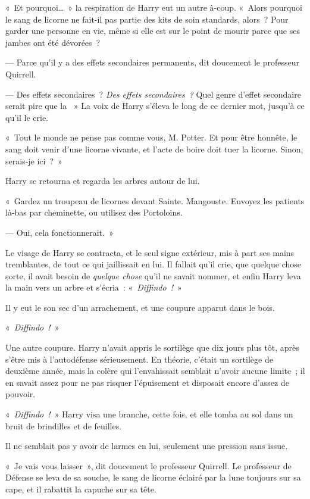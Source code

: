 «~Et pourquoi…~»
la respiration de Harry eut un autre à-coup.
«~Alors pourquoi le sang de licorne ne fait-il pas partie des kits de soin standards, alors~?
Pour garder une personne en vie, même si elle est sur le point de mourir parce que ses jambes ont été dévorées~?

--- Parce qu'il y a des effets secondaires permanents, dit doucement le professeur Quirrell.

--- Des effets secondaires~?
\emph{Des effets secondaires~?} Quel genre d'effet secondaire serait pire que la ~» La voix de Harry s'éleva le long de ce dernier mot, jusqu'à ce qu'il le crie.

«~Tout le monde ne pense pas comme vous, M. Potter.
Et pour être honnête, le sang doit venir d'une licorne vivante, et l'acte de boire doit tuer la licorne.
Sinon, serais-je ici~?~»

Harry se retourna et regarda les arbres autour de lui.

«~Gardez un troupeau de licornes devant Sainte.
Mangouste.
Envoyez les patients là-bas par cheminette, ou utilisez des Portoloins.

--- Oui, cela fonctionnerait.~»

Le visage de Harry se contracta, et le seul signe extérieur, mis à part ses mains tremblantes, de tout ce qui jaillissait en lui.
Il fallait qu'il crie, que quelque chose sorte, il avait besoin de \emph{quelque chose} qu'il ne savait nommer, et enfin Harry leva la main vers un arbre et s'écria~: «~\emph{Diffindo~!}~»

Il y eut le son sec d'un arrachement, et une coupure apparut dans le bois.

«~\emph{Diffindo~!}~»

Une autre coupure.
Harry n'avait appris le sortilège que dix jours plus tôt, après s'être mis à l'autodéfense sérieusement.
En théorie, c'était un sortilège de deuxième année, mais la colère qui l'envahissait semblait n'avoir aucune limite~; il en savait assez pour ne pas risquer l'épuisement et disposait encore d'assez de pouvoir.

«~\emph{Diffindo~!}~» Harry visa une branche, cette fois, et elle tomba au sol dans un bruit de brindilles et de feuilles.

Il ne semblait pas y avoir de larmes en lui, seulement une pression sans issue.

«~Je vais vous laisser~», dit doucement le professeur Quirrell.
Le professeur de Défense se leva de sa souche, le sang de licorne éclairé par la lune toujours sur sa cape, et il rabattit la capuche sur sa tête.
